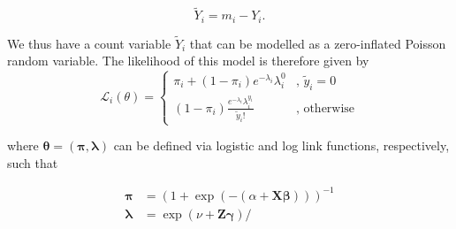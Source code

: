 \begin{equation*}
    \widetilde{Y}_i = m_i - Y_i.
\end{equation*}

We thus have a count variable $\widetilde{Y}_i$ that can be modelled as a zero-inflated Poisson random variable. The likelihood of this model is therefore given by 
\begin{equation*}
    \mathcal{L}_i(\theta) = \begin{cases}
    \pi_i + (1-\pi_i) e^{-\lambda_i} \lambda_i^{0} & \text{, $\tilde{y}_i = 0$} \\
    (1-\pi_i) \frac{e^{-\lambda_i} \lambda_i^{y_i}}{\tilde{y}_i!} & \text{, otherwise}
    \end{cases}
\end{equation*}

where $\bm\theta = (\bm\pi, \bm\lambda)$ can be defined via logistic and log link functions, respectively, such that 

\begin{align*}
    \bm\pi &= (1 + \exp(-(\alpha + \bm{X} \bm\beta)))^{-1} \\
    \bm\lambda &= \exp(\nu+ \bm{Z} \bm\gamma)/ 
\end{align*}